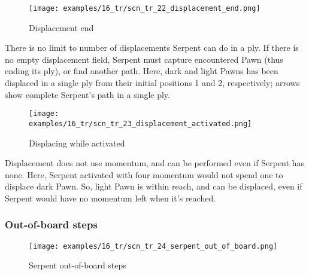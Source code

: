 \vspace*{5.1\baselineskip}

\noindent
\begin{wrapfigure}[11]{l}{0.4\textwidth}
\centering
\texttt{[image: examples/16\_tr/scn\_tr\_22\_displacement\_end.png]}
\vspace*{-0.5\baselineskip}
\caption{Displacement end}
\label{fig:scn_tr_22_displacement_end}
\end{wrapfigure}
\indent
There is no limit to number of displacements Serpent can do in a ply. If there is no
empty displacement field, Serpent must capture encountered Pawn (thus ending its ply),
or find another path.\newline
\indent
Here, dark and light Pawns has been displaced in a single ply from their initial positions
1 and 2, respectively; arrows show complete Serpent's path in a single ply.

\noindent
\begin{wrapfigure}[11]{l}{0.4\textwidth}
\centering
\texttt{[image: examples/16\_tr/scn\_tr\_23\_displacement\_activated.png]}
\vspace*{-0.5\baselineskip}
\caption{Displacing while activated}
\label{fig:scn_tr_23_displacement_activated}
\end{wrapfigure}
Displacement does not use momentum, and can be performed even if Serpent has none.\newline
\indent
Here, Serpent activated with four momentum would not spend one to displace dark
Pawn. So, light Pawn is within reach, and can be displaced, even if Serpent would
have no momentum left when it's reached.

\clearpage %

\subsubsection*{Out-of-board steps}
\label{sec:Tamoanchan Revisited/Serpent/Movement/Out-of-board steps}

\vspace*{-1.0\baselineskip}
\noindent
\begin{figure}[!h]
\texttt{[image: examples/16\_tr/scn\_tr\_24\_serpent\_out\_of\_board.png]}
\caption{Serpent out-of-board steps}
\label{fig:scn_tr_24_serpent_out_of_board}
\end{figure}


